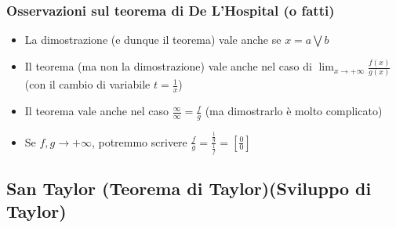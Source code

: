 \documentclass{article}
\theoremstyle{definition}
\begin{document}
\subsubsection{Osservazioni sul teorema di De L'Hospital (o fatti)}
\begin{itemize}
    \item La dimostrazione (e dunque il teorema) vale anche se $x =a \bigvee b$
    \item Il teorema (ma non la dimostrazione) vale anche nel caso di $\lim_{x \to +\infty}\frac{f(x)}{g(x)}$ (con il cambio di variabile $t=\frac{1}{x}$)
    \item Il teorema vale anche nel caso $\frac{\infty}{\infty}=\frac{f}{g}$ (ma dimostrarlo è molto complicato)
    \item Se $f,g \to +\infty$, potremmo scrivere $\frac{f}{g}=\frac{\frac{1}{g}}{\frac{1}{f}}=\left[\frac{0}{0}\right]$
\end{itemize}
\subsection{San Taylor (Teorema di Taylor)(Sviluppo di Taylor)}
\end{document}
